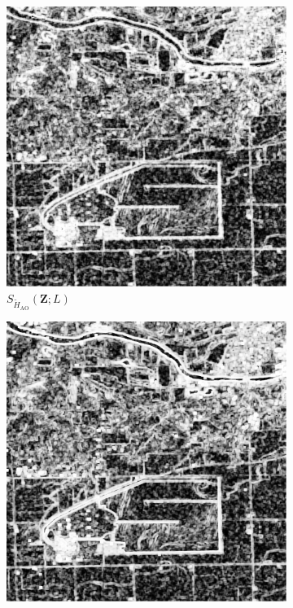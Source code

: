 \begin{figure}[H]
  \centering
  \begin{subfigure}[b]{0.3\textwidth}
    \centering
    \includegraphics[width=\textwidth]{../../Figures/PNG/Entropy_Illinois_1024_36L_AO_200b}
    \caption{$S_{\widetilde{H}_{\text{AO}}}(\bm{Z}; L)$}
    \label{fig:real_images_test_Illinois-1}
  \end{subfigure}
  \hfill
  \begin{subfigure}[b]{0.3\textwidth}
    \centering
    \includegraphics[width=\textwidth]{../../Figures/PNG/cv_Illinois_crops_1024}

\end{subfigure}
\end{figure}
